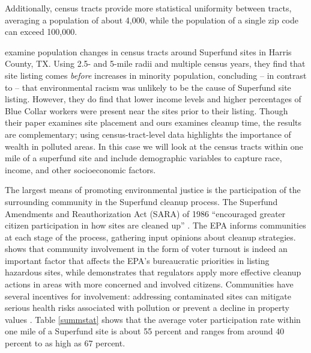 \documentclass[12pt]{article}
\begin{document}
Additionally, census tracts provide more statistical uniformity between tracts, averaging a population of about 4,000, while the population of a single zip code can exceed 100,000. 


 

\textcite{Aydin2006} examine population changes in census tracts around Superfund sites in Harris County, TX. Using 2.5- and 5-mile radii and multiple census years, they find that site listing comes {\it before} increases in minority population, concluding -- in contrast to \textcite{burda2014environmental} -- that environmental racism was unlikely to be the cause of Superfund site listing. However, they do find that lower income levels and higher percentages of Blue Collar workers were present near the sites prior to their listing. Though their paper examines site placement and ours examines cleanup time, the results are complementary; using census-tract-level data highlights the importance of wealth in polluted areas. In this case we will look at the census tracts within one mile of a superfund site and include demographic variables to capture race, income, and other socioeconomic factors.

The largest means of promoting environmental justice is the participation of the surrounding community in the Superfund cleanup process. The Superfund Amendments and Reauthorization Act (SARA) of 1986 ``encouraged greater citizen participation in how sites are cleaned up'' \parencite{OLEM}. The EPA informs communities at each stage of the process,  gathering input opinions about cleanup strategies. \textcite{Sigman2001} shows that community involvement in the form of voter turnout is indeed an important factor that affects the EPA's bureaucratic priorities in listing hazardous sites, while \textcite{Viscusi1999} demonstrates that regulators apply more effective cleanup actions in areas with more concerned and involved citizens. Communities have several incentives for involvement: addressing contaminated sites can mitigate serious health risks associated with pollution or prevent a decline in property values \parencite{kohlhase1991impact}. Table \ref{summstat} shows that the average voter participation rate within one mile of a Superfund site is about 55 percent and ranges from around 40 percent to as high as 67 percent.
\end{document}
